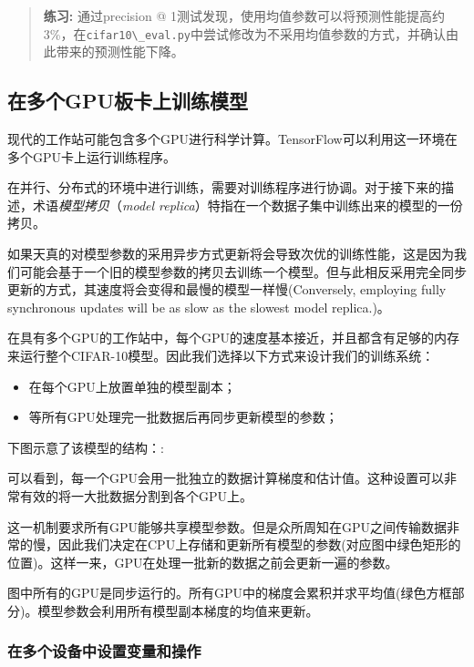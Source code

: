 \begin{quote}
\textbf{练习:} 通过precision @
1测试发现，使用均值参数可以将预测性能提高约3\%，在\lstinline{cifar10\_eval.py}中尝试修改为不采用均值参数的方式，并确认由此带来的预测性能下降。
\end{quote}

\subsection{在多个GPU板卡上训练模型
}\label{ux5728ux591aux4e2agpuux677fux5361ux4e0aux8badux7ec3ux6a21ux578b}

现代的工作站可能包含多个GPU进行科学计算。TensorFlow可以利用这一环境在多个GPU卡上运行训练程序。

在并行、分布式的环境中进行训练，需要对训练程序进行协调。对于接下来的描述，术语\emph{模型拷贝}（\emph{model
replica}）特指在一个数据子集中训练出来的模型的一份拷贝。

如果天真的对模型参数的采用异步方式更新将会导致次优的训练性能，这是因为我们可能会基于一个旧的模型参数的拷贝去训练一个模型。但与此相反采用完全同步更新的方式，其速度将会变得和最慢的模型一样慢(Conversely,
employing fully synchronous updates will be as slow as the slowest model
replica.)。

在具有多个GPU的工作站中，每个GPU的速度基本接近，并且都含有足够的内存来运行整个CIFAR-10模型。因此我们选择以下方式来设计我们的训练系统：

\begin{itemize}
\item
  在每个GPU上放置单独的模型副本；
\item
  等所有GPU处理完一批数据后再同步更新模型的参数；
\end{itemize}

下图示意了该模型的结构：:

可以看到，每一个GPU会用一批独立的数据计算梯度和估计值。这种设置可以非常有效的将一大批数据分割到各个GPU上。

这一机制要求所有GPU能够共享模型参数。但是众所周知在GPU之间传输数据非常的慢，因此我们决定在CPU上存储和更新所有模型的参数(对应图中绿色矩形的位置)。这样一来，GPU在处理一批新的数据之前会更新一遍的参数。

图中所有的GPU是同步运行的。所有GPU中的梯度会累积并求平均值(绿色方框部分)。模型参数会利用所有模型副本梯度的均值来更新。

\subsubsection{在多个设备中设置变量和操作}\label{ux5728ux591aux4e2aux8bbeux5907ux4e2dux8bbeux7f6eux53d8ux91cfux548cux64cdux4f5c}

